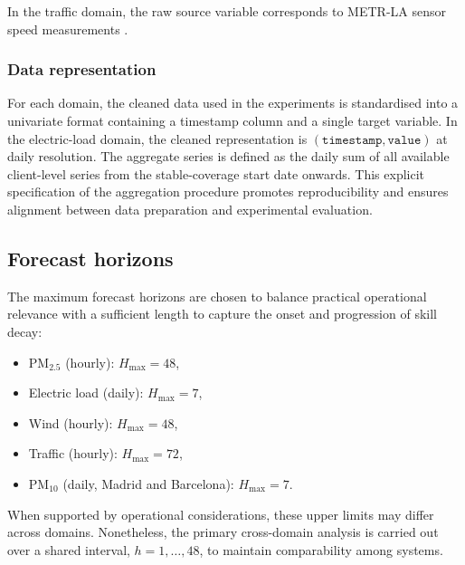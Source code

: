 \documentclass[pdflatex,sn-mathphys]{sn-jnl}
\begin{document}
In the traffic domain, the raw source variable corresponds to METR-LA
sensor speed measurements \citep{li2018dcrnn}.

\subsubsection{Data representation}
For each domain, the cleaned data used in the experiments is
standardised into a univariate format containing a timestamp column and
a single target variable. In the electric-load domain, the cleaned
representation is $(\texttt{timestamp}, \texttt{value})$ at daily
resolution. The aggregate series is defined as the daily sum of all
available client-level series from the stable-coverage start date
onwards. This explicit specification of the aggregation procedure
promotes reproducibility and ensures alignment between data preparation
and experimental evaluation.

\subsection{Forecast horizons}
The maximum forecast horizons are chosen to balance practical
operational relevance with a sufficient length to capture the onset and
progression of skill decay:
\begin{itemize}
  \item PM$_{2.5}$ (hourly): $H_{\max}=48$,
  \item Electric load (daily): $H_{\max}=7$,
  \item Wind (hourly): $H_{\max}=48$,
  \item Traffic (hourly): $H_{\max}=72$,
  \item PM$_{10}$ (daily, Madrid and Barcelona): $H_{\max}=7$.
\end{itemize}
When supported by operational considerations, these upper limits may
differ across domains. Nonetheless, the primary cross-domain analysis
is carried out over a shared interval, $h=1,\ldots,48$, to maintain
comparability among systems.
\end{document}
